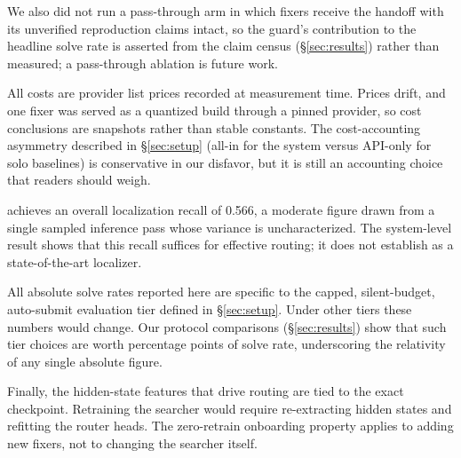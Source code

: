 We also did not run a pass-through arm in which fixers receive the
handoff with its unverified reproduction claims intact, so the guard's
contribution to the headline solve rate is asserted from the claim
census (\S\ref{sec:results}) rather than measured; a pass-through
ablation is future work.

All costs are provider list prices recorded at measurement time.
Prices drift, and one fixer was served as a quantized build through a
pinned provider, so cost conclusions are snapshots rather than stable
constants.  The cost-accounting asymmetry described in
\S\ref{sec:setup} (all-in for the system versus API-only for solo
baselines) is conservative in our disfavor, but it is still an
accounting choice that readers should weigh.

\modelname achieves an overall localization recall of 0.566, a moderate
figure drawn from a single sampled inference pass whose variance is
uncharacterized.  The system-level result shows that this recall
suffices for effective routing; it does not establish \modelname as a
state-of-the-art localizer.

All absolute solve rates reported here are specific to the capped,
silent-budget, auto-submit evaluation tier defined in
\S\ref{sec:setup}.  Under other tiers these numbers would change.  Our
protocol comparisons (\S\ref{sec:results}) show that such tier choices
are worth percentage points of solve rate, underscoring the relativity
of any single absolute figure.

Finally, the hidden-state features that drive routing are tied to the
exact \modelname checkpoint.  Retraining the searcher would require
re-extracting hidden states and refitting the router heads.  The
zero-retrain onboarding property applies to adding new fixers, not to
changing the searcher itself.
